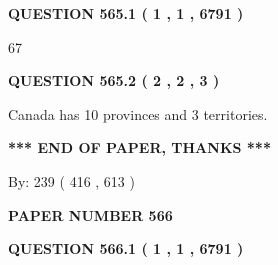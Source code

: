 \documentclass[12pt]{article}
\begin{document}
   
  
\vspace{0.2in}
  
{\textbf{\Large{QUESTION
565.1 
 ( 1 , 1 , 6791 )
}}}
  
  
 
 
\noindent{}

67
 
 
  
\vspace{0.2in}
  
{\textbf{\Large{QUESTION
565.2 
 ( 2 , 2 , 3 )
}}}
  
  
 
 
\noindent{}
 
 
Canada has 10  provinces and 3 territories.
 
 
 
 
   
   
 \vspace{0.2in}
 
   
   
   
   
\vspace{1.0in} 
{\textbf{\large{ *** END OF PAPER, THANKS *** }}} 
   
   
\hspace{1.0in} By: 
 239 ( 416 ,  613 )
   
   
   
   
\newpage 
\setcounter{page}{ 
   566001 } 
   
   
   
   
 {\textbf{ \Large{ PAPER NUMBER  566  }}}
   
   
\vspace{0.2in}
   
   
   
   
   
   
 \vspace{0.2in}
 
 
 
 
   
   
  
\vspace{0.2in}
  
{\textbf{\Large{QUESTION
566.1 
 ( 1 , 1 , 6791 )
}}}
  
\end{document}
